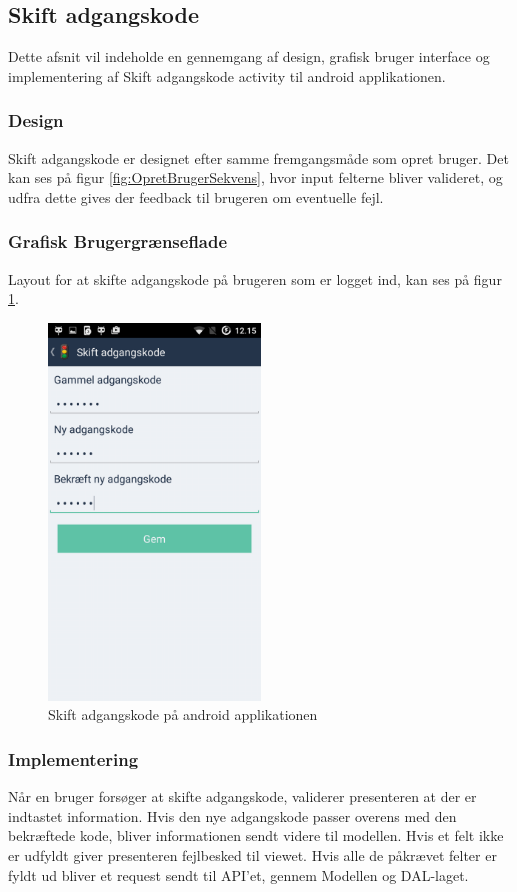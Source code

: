 	\clearpage
	
	\subsection{Skift adgangskode}
		Dette afsnit vil indeholde en gennemgang af design, grafisk bruger interface og implementering af Skift adgangskode activity til android applikationen.
	\subsubsection{Design}
	Skift adgangskode er designet efter samme fremgangsmåde som opret bruger. Det kan ses på figur \ref{fig:OpretBrugerSekvens}, hvor input felterne bliver valideret, og udfra dette gives der feedback til brugeren om eventuelle fejl. 
	
	\subsubsection{Grafisk Brugergrænseflade}
	Layout for at skifte adgangskode på brugeren som er logget ind, kan ses på figur \ref{fig:Skift adgangskode på android applikationen}.	
	\begin{figure} [!ht]
		\begin{center}
			\includegraphics[height=10cm]{Android/Billeder/AndroidSkiftAdgangskode}
		\end{center}
		\caption{Skift adgangskode på android applikationen}
		\label{fig:Skift adgangskode på android applikationen}
	\end{figure}
	
	\subsubsection{Implementering}
	Når en bruger forsøger at skifte adgangskode, validerer presenteren at der er indtastet information. Hvis den nye adgangskode passer overens med den bekræftede kode, bliver informationen sendt videre til modellen. Hvis et felt ikke er udfyldt giver presenteren fejlbesked til viewet. Hvis alle de påkrævet felter er fyldt ud bliver et request sendt til API'et, gennem Modellen og DAL-laget.
	
